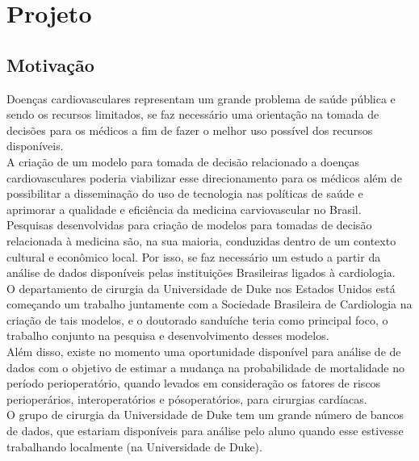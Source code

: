 \documentclass{article}
\begin{document}
\section{ \label{sec:projeto} Projeto}

\subsection{ \label{subsec:motivacao} Motivação}
Doenças cardiovasculares representam um grande problema de saúde pública e sendo os recursos limitados, 
se faz necessário uma orientação na tomada de decisões para os médicos a fim de fazer o melhor uso possível dos 
recursos disponíveis.\\ 
A criação de um modelo para tomada de decisão relacionado a doenças cardiovasculares poderia viabilizar esse 
direcionamento para os médicos além de possibilitar a disseminação do uso de tecnologia nas políticas de saúde e
aprimorar a qualidade e eficiência da medicina carviovascular no Brasil.\\
Pesquisas desenvolvidas para criação de modelos para tomadas de decisão relacionada à medicina são, na sua maioria, 
conduzidas dentro de um contexto cultural e econômico local. Por isso, se faz necessário um estudo a partir da 
análise de dados disponíveis pelas instituições Brasileiras ligados à cardiologia.\\
O departamento de cirurgia da Universidade de Duke nos Estados Unidos está começando um trabalho juntamente com 
a Sociedade Brasileira de Cardiologia na criação de tais modelos, e o doutorado sanduíche teria como principal foco, 
o trabalho conjunto na pesquisa e desenvolvimento desses modelos.\\
Além disso, existe no momento uma oportunidade disponível para análise de de dados com o objetivo
de estimar a mudança na probabilidade de mortalidade no período perioperatório, quando levados em consideração os 
fatores de riscos perioperários, interoperatórios e pósoperatórios, para cirurgias cardíacas.\\
O grupo de cirurgia da Universidade de Duke tem um grande número de bancos de dados, que estariam disponíveis 
para análise pelo aluno quando esse estivesse trabalhando localmente (na Universidade de Duke).
\end{document}
